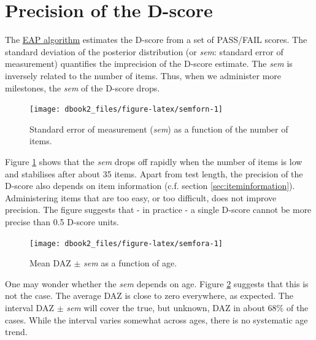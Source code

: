 \documentclass[
]{book}
\begin{document}
\hypertarget{sec:sem}{%
\section{Precision of the D-score}\label{sec:sem}}

The \href{https://d-score.org/dbook1/sec-dscoreestimation.html\#eap-algorithm-numerical-example}{EAP algorithm} estimates the D-score from a set of PASS/FAIL scores. The standard deviation of the posterior distribution (or \emph{sem}: standard error of measurement) quantifies the imprecision of the D-score estimate. The \emph{sem} is inversely related to the number of items. Thus, when we administer more milestones, the \emph{sem} of the D-score drops.

\begin{figure}

{\centering \texttt{[image: dbook2\_files/figure-latex/semforn-1]} 

}

\caption{Standard error of measurement (\emph{sem}) as a function of the number of items.}\label{fig:semforn}
\end{figure}



Figure \ref{fig:semforn} shows that the \emph{sem} drops off rapidly when the number of items is low and stabilises after about 35 items. Apart from test length, the precision of the D-score also depends on item information (c.f. section \ref{sec:iteminformation}). Administering items that are too easy, or too difficult, does not improve precision. The figure suggests that - in practice - a single D-score cannot be more precise than 0.5 D-score units.

\begin{figure}

{\centering \texttt{[image: dbook2\_files/figure-latex/semfora-1]} 

}

\caption{Mean DAZ \(\pm\) \emph{sem} as a function of age.}\label{fig:semfora}
\end{figure}



One may wonder whether the \emph{sem} depends on age. Figure \ref{fig:semfora} suggests that this is not the case. The average DAZ is close to zero everywhere, as expected. The interval DAZ \(\pm\) \emph{sem} will cover the true, but unknown, DAZ in about 68\% of the cases. While the interval varies somewhat across ages, there is no systematic age trend.
\end{document}
